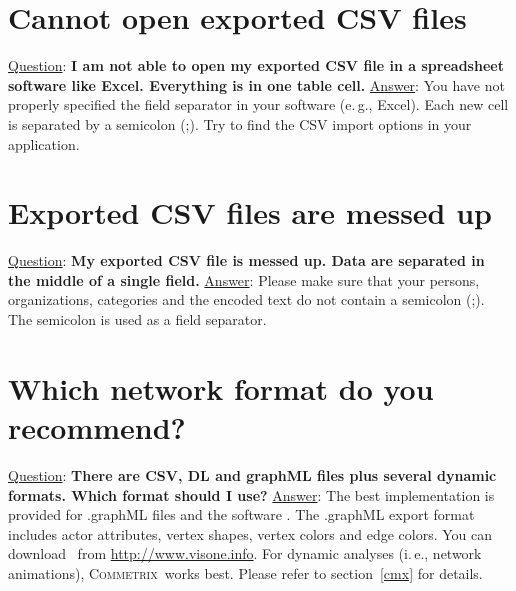 \documentclass[12pt,a4paper]{scrreprt}
\newcommand{\visone}
{\textsf%
 {\protect\raisebox{.5ex}{\color[rgb]{0.1,0.1,0.1}v}%
  \protect\raisebox{.1ex}{\color[rgb]{0.3,0.3,0.3}i}%
  \protect\raisebox{-.1ex}{\color[rgb]{0.1,0.1,0.1}s}%
  \protect\raisebox{.1ex}{\color[rgb]{0.3,0.3,0.3}o}%
  \protect\raisebox{-.1ex}{\color[rgb]{0.1,0.1,0.1}n}%
  \protect\raisebox{-.4ex}{\color[rgb]{0.3,0.3,0.3}e}%
 }%
}
\newcommand{\commetrix}{\textsc{Commetrix}}
\begin{document}
\section{Cannot open exported CSV files}
\underline{Question}: \textbf{I am not able to open my exported CSV file in a spreadsheet software like Excel. Everything is in one table cell.}
\vspace{0.3cm} \newline
\underline{Answer}: You have not properly specified the field separator in your software (e.\,g., Excel). Each new cell is separated by a semicolon (;). Try to find the CSV import options in your application.

\section{Exported CSV files are messed up}
\underline{Question}: \textbf{My exported CSV file is messed up. Data are separated in the middle of a single field.}
\vspace{0.3cm} \newline
\underline{Answer}: Please make sure that your persons, organizations, categories and the encoded text do not contain a semicolon (;). The semicolon is used as a field separator.

\enlargethispage{1cm}

\section{Which network format do you recommend?}
\underline{Question}: \textbf{There are CSV, DL and graphML files plus several dynamic formats. Which format should I use?}
\vspace{0.3cm} \newline
\underline{Answer}: The best implementation is provided for .graphML files and the software \visone. The .graphML export format includes actor attributes, vertex shapes, vertex colors and edge colors. You can download \visone\ from \url{http://www.visone.info}. For dynamic analyses (i.\,e., network animations), \commetrix\ works best. Please refer to section~\ref{cmx} for details.



\end{document}
